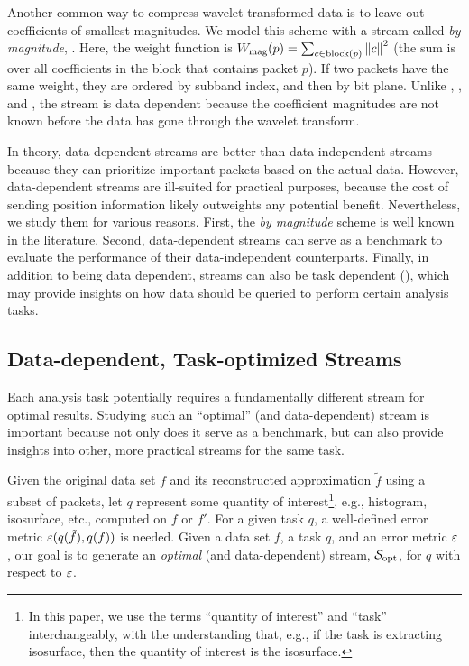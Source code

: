 Another common way to compress wavelet-transformed data is to leave out coefficients of smallest
magnitudes. We model this scheme with a stream called \emph{by magnitude}, \smag. Here, the weight
function is $\wmag(p)=\sum_{c\in \text{block}(p)}\norm{c}^2$ (the sum is over all coefficients in
the block that contains packet $p$). If two packets have the same weight, they are ordered by
subband index, and then by bit plane. Unlike \slvl, \sbit, and \swav, the \smag stream is data
dependent because the coefficient magnitudes are not known before the data has gone through the
wavelet transform.

In theory, data-dependent streams are better than data-independent streams because they can
prioritize important packets based on the actual data. However, data-dependent streams are
ill-suited for practical purposes, because the cost of sending position information likely
outweights any potential benefit. Nevertheless, we study them for various reasons. First, the
\emph{by magnitude} scheme is well known in the literature. Second, data-dependent streams can serve
as a benchmark to evaluate the performance of their data-independent counterparts. Finally, in
addition to being data dependent, streams can also be task dependent (),
which may provide insights on how data should be queried to perform certain analysis tasks.

\subsection{Data-dependent, Task-optimized Streams} \label{sec:data_dep_streams}

Each analysis task potentially requires a fundamentally different stream for optimal results.
Studying such an ``optimal'' (and data-dependent) stream is important because not only does it serve
as a benchmark, but can also provide insights into other, more practical streams for the same task.

Given the original data set $f$ and its reconstructed approximation $\tilde{f}$ using a subset of
packets, let $q$ represent some quantity of interest\footnote{In this paper, we use the terms
``quantity of interest'' and ``task'' interchangeably, with the understanding that, e.g., if the
task is extracting isosurface, then the quantity of interest is the isosurface.}, e.g., histogram,
isosurface, etc., computed on $f$ or $f'$. For a given task $q$, a well-defined error metric
$\err(q(\tilde{f}),q(f))$ is needed. Given a data set $f$, a task $q$, and an error metric $\err$,
our goal is to generate an \emph{optimal} (and data-dependent) stream, $\sopt$, for $q$ with respect
to $\err$.

